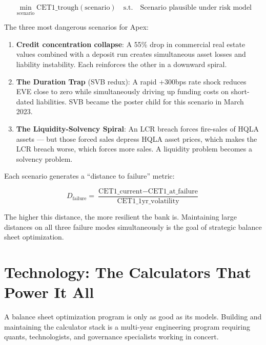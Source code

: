 \documentclass[12pt,a4paper]{article}
\begin{document}
\begin{equation}
  \min_{\text{scenario}} \text{CET1\_trough}(\text{scenario})
  \quad \text{s.t.} \quad \text{Scenario plausible under risk model}
\end{equation}

The three most dangerous scenarios for Apex:

\begin{enumerate}[noitemsep]
  \item \textbf{Credit concentration collapse}: A 55\% drop in commercial
        real estate values combined with a deposit run creates simultaneous
        asset losses and liability instability.  Each reinforces the other
        in a downward spiral.
  \item \textbf{The Duration Trap} (SVB redux): A rapid +300bps rate shock
        reduces EVE close to zero while simultaneously driving up funding
        costs on short-dated liabilities.  SVB became the poster child for
        this scenario in March 2023.
  \item \textbf{The Liquidity-Solvency Spiral}: An LCR breach forces
        fire-sales of HQLA assets --- but those forced sales depress HQLA
        asset prices, which makes the LCR breach worse, which forces more
        sales.  A liquidity problem becomes a solvency problem.
\end{enumerate}

Each scenario generates a ``distance to failure'' metric:

\begin{equation}
  D_{\text{failure}} = \frac{\text{CET1\_current} - \text{CET1\_at\_failure}}
                            {\text{CET1\_1yr\_volatility}}
\end{equation}

The higher this distance, the more resilient the bank is.  Maintaining large
distances on all three failure modes simultaneously is the goal of strategic
balance sheet optimization.

\section{Technology: The Calculators That Power It All}

A balance sheet optimization program is only as good as its models.  Building
and maintaining the calculator stack is a multi-year engineering program
requiring quants, technologists, and governance specialists working in concert.
\end{document}
